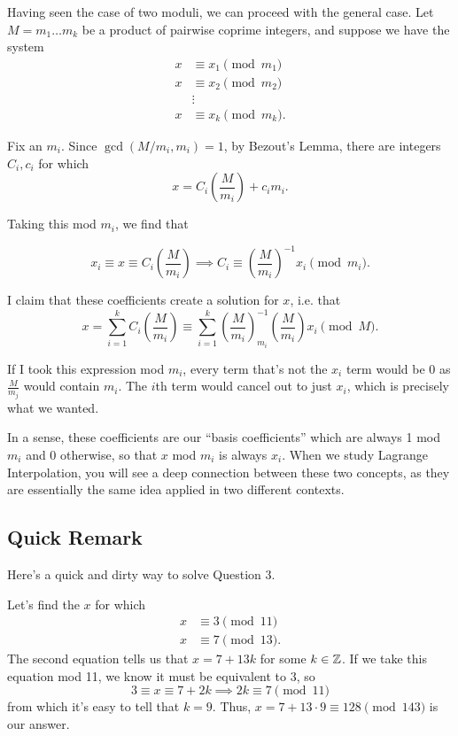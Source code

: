 \documentclass[11 pt]{scrartcl}
\begin{document}
    Having seen the case of two moduli, we can proceed with the general case. Let $M = m_1\dots m_k$ be a product of pairwise coprime integers, and suppose we have the system 
    \begin{align*}
        x &\equiv x_1 \pmod{m_1} \\ 
        x &\equiv x_2 \pmod{m_2} \\ 
          &\vdots  \\
        x &\equiv x_k \pmod{m_k}.
    \end{align*}
    
    Fix an $m_i$. Since $\gcd(M/m_i, m_i) = 1$, by Bezout's Lemma, there are integers $C_i, c_i$ for which 
    \[ x = C_i \left(\dfrac{M}{m_i}\right) + c_i m_i.\] 

    Taking this mod $m_i$, we find that 

    \[ x_i \equiv x \equiv C_i \left(\dfrac{M}{m_i}\right) \implies C_i \equiv \left(\dfrac{M}{m_i}\right)^{-1} x_i \pmod{m_i}.\] 

    I claim that these coefficients create a solution for $x$, i.e. that 
    \[ x = \sum_{i = 1}^k C_i \left(\dfrac{M}{m_i}\right) \equiv \sum_{i=1}^k \left(\dfrac{M}{m_i}\right)^{-1}_{m_i} \left(\dfrac{M}{m_i}\right) x_i \pmod{M}.\] 

    If I took this expression mod $m_i$, every term that's not the $x_i$ term would be 0 as $\frac{M}{m_j}$ would contain $m_i$. The $i$th term would cancel out to just $x_i$, which is precisely what we wanted. 

    In a sense, these coefficients are our ``basis coefficients'' which are always 1 mod $m_i$ and 0 otherwise, so that $x$ mod $m_i$ is always $x_i$. When we study Lagrange Interpolation, you will see a deep connection between these two concepts, as they are essentially the same idea applied in two different contexts. 


\subsection{Quick Remark}
Here's a quick and dirty way to solve Question 3. 
\begin{example}
    Let's find the $x$ for which 
    \begin{align*}
        x&\equiv 3 \pmod{11} \\ 
        x&\equiv 7 \pmod{13}.
    \end{align*}
    The second equation tells us that $x = 7 + 13k$ for some $k\in \mathbb Z$. If we take this equation mod 11, we know it must be equivalent to 3, so 
    \[ 3 \equiv x \equiv 7 + 2k \implies 2k \equiv 7\pmod{11}\] 
    from which it's easy to tell that $k = 9$. Thus, $x = 7 + 13\cdot 9 \equiv 128 \pmod{143}$ is our answer.
\end{example}
\end{document}
